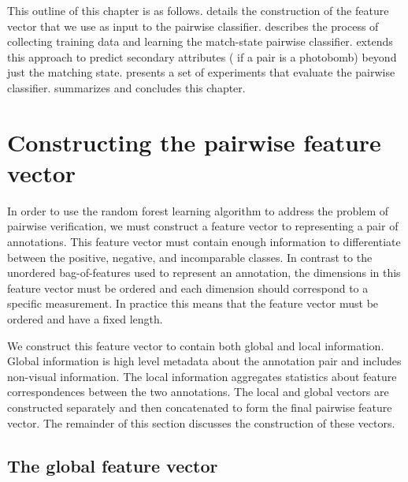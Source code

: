 This outline of this chapter is as follows.
 details the construction of the feature vector that we use as input to the pairwise
  classifier.
 describes the process of collecting training data and learning the match-state pairwise
  classifier.
 extends this approach to predict secondary attributes (\eg{} if a pair is a photobomb) beyond
  just the matching state.
 presents a set of experiments that evaluate the pairwise classifier.
 summarizes and concludes this chapter.


\section{Constructing the pairwise feature vector}\label{sec:pairfeat}

In order to use the random forest learning algorithm to address the problem of pairwise verification, we must
  construct a feature vector to representing a pair of annotations.
This feature vector must contain enough information to differentiate between the positive, negative, and
  incomparable classes.
In contrast to the unordered bag-of-features used to represent an annotation, the dimensions in this feature
  vector must be ordered and each dimension should correspond to a specific measurement.
In practice this means that the feature vector must be ordered and have a fixed length.

We construct this feature vector to contain both global and local information.
Global information is high level metadata about the annotation pair and includes non-visual information.
The local information aggregates statistics about feature correspondences between the two annotations.
The local and global vectors are constructed separately and then concatenated to form the final pairwise feature
  vector.
The remainder of this section discusses the construction of these vectors.

\subsection{The global feature vector}

